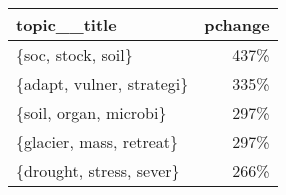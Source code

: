 \begin{tabular}{p{2cm}r}
\toprule
              topic\_\_title &  pchange \\
\midrule
        \{soc, stock, soil\} &     437\% \\
 \{adapt, vulner, strategi\} &     335\% \\
    \{soil, organ, microbi\} &     297\% \\
  \{glacier, mass, retreat\} &     297\% \\
  \{drought, stress, sever\} &     266\% \\
\bottomrule
\end{tabular}
